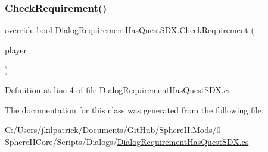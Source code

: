 \subsubsection{\texorpdfstring{CheckRequirement()}{CheckRequirement()}}
{\footnotesize\ttfamily override bool Dialog\+Requirement\+Has\+Quest\+S\+D\+X.\+Check\+Requirement (\begin{DoxyParamCaption}\item[{Entity\+Player}]{player }\end{DoxyParamCaption})}



Definition at line 4 of file Dialog\+Requirement\+Has\+Quest\+S\+D\+X.\+cs.



The documentation for this class was generated from the following file\+:\begin{DoxyCompactItemize}
\item 
C\+:/\+Users/jkilpatrick/\+Documents/\+Git\+Hub/\+Sphere\+I\+I.\+Mods/0-\/\+Sphere\+I\+I\+Core/\+Scripts/\+Dialogs/\mbox{\hyperlink{_dialog_requirement_has_quest_s_d_x_8cs}{Dialog\+Requirement\+Has\+Quest\+S\+D\+X.\+cs}}\end{DoxyCompactItemize}
